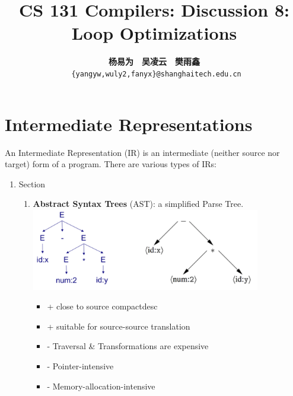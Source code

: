 \documentclass[a4paper]{article}
\title{CS 131 Compilers: Discussion 8: Loop Optimizations}
\author{\textbf{杨易为}~~\textbf{吴凌云}~~\textbf{樊雨鑫} \\ \texttt{ \{yangyw,wuly2,fanyx\}@shanghaitech.edu.cn}}
\theoremstyle{definition}
\begin{document}
\maketitle
\section{Intermediate Representations}
An Intermediate Representation (IR) is an intermediate (neither source nor target) form of a program. There are various types of IRs:
\begin{enumerate}
  \item Section
  \begin{enumerate}
    \item \textbf{Abstract Syntax Trees} (AST): a simplified Parse Tree.\\
    \includegraphics[width=10cm]{img/Snipaste_2021-04-19_07-08-30.png}
    \begin{itemize}
      \item + close to source compactdesc
      \item + suitable for source-source translation
      \item - Traversal \& Transformations are expensive
      \item - Pointer-intensive
      \item - Memory-allocation-intensive
    \end{itemize}


\end{enumerate}
\end{enumerate}
\end{document}
